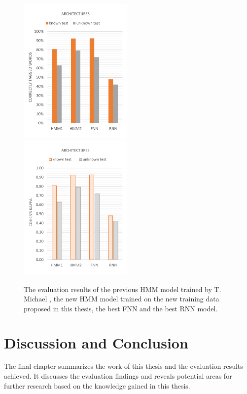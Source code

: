 \begin{figure}[H]
\centering
{}
{\includegraphics[width=0.495\textwidth]{images/comparison}}
{\includegraphics[width=0.495\textwidth]{images/comparison_k}}
\vspace{1em}
\caption[Comparison of all Architectures]{The evaluation results of the previous HMM model trained by T. Michael \cite{michael2016}, the new HMM model trained on the new training data proposed in this thesis, the best FNN and the best RNN model.}
\label{f.evaluation.comparison}
\end{figure}

\chapter{Discussion and Conclusion}\label{c.conclusion}
The final chapter summarizes the work of this thesis and the evaluation results achieved. It discusses the evaluation findings and reveals potential areas for further research based on the knowledge gained in this thesis.

